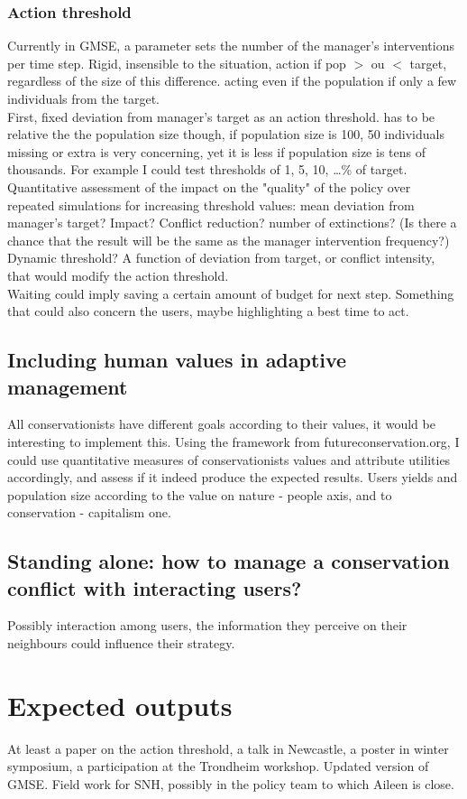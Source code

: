 \documentclass[12pt,a4paper]{article}
\begin{document}
\subsubsection{Action threshold}
Currently in GMSE, a parameter sets the number of the manager's interventions per time step. Rigid, insensible to the situation, action if pop $>$ ou $<$ target, regardless of the size of this difference. acting even if the population if only a few individuals from the target.\\
First, fixed deviation from manager's target as an action threshold. has to be relative the the population size though, if population size is 100, 50 individuals missing or extra is very concerning, yet it is less if population size is tens of thousands. For example I could test thresholds of 1, 5, 10, \dots \% of target.\\ 
Quantitative assessment of the impact on the "quality" of the policy over repeated simulations for increasing threshold values: mean deviation from manager's target? Impact? Conflict reduction? number of extinctions? (Is there a chance that the result will be the same as the manager intervention frequency?)\\
Dynamic threshold? A function of deviation from target, or conflict intensity, that would modify the action threshold.\\
Waiting could imply saving a certain amount of budget for next step. Something that could also concern the users, maybe highlighting a best time to act.

\subsection{Including human values in adaptive management}

All conservationists have different goals according to their values, it would be interesting to implement this. Using the framework from futureconservation.org, I could use quantitative measures of conservationists values and attribute utilities accordingly, and assess if it indeed produce the expected results. Users yields and population size according to the value on nature - people axis, and to conservation - capitalism one. 

\subsection{Standing alone: how to manage a conservation conflict with interacting users?}

Possibly interaction among users, the information they perceive on their neighbours could influence their strategy.

\section{Expected outputs}

At least a paper on the action threshold, a talk in Newcastle, a poster in winter symposium, a participation at the Trondheim workshop. Updated version of GMSE. Field work for SNH, possibly in the policy team to which Aileen is close.
\end{document}
